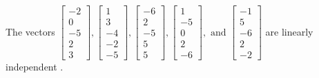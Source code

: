 \begin{exercise}
\begin{exerciseStatement}
  \end{exerciseStatement}
  \begin{exerciseAnswer}
   The vectors \(\left[\begin{array}{r}
-2 \\
0 \\
-5 \\
2 \\
3
\end{array}\right] , \left[\begin{array}{r}
1 \\
3 \\
-4 \\
-2 \\
-5
\end{array}\right] , \left[\begin{array}{r}
-6 \\
2 \\
-5 \\
5 \\
5
\end{array}\right] , \left[\begin{array}{r}
1 \\
-5 \\
0 \\
2 \\
-6
\end{array}\right] , \text{ and } \left[\begin{array}{r}
-1 \\
5 \\
-6 \\
2 \\
-2
\end{array}\right]\) are 
  	 linearly independent  .
  


  \end{exerciseAnswer}
\end{exercise}